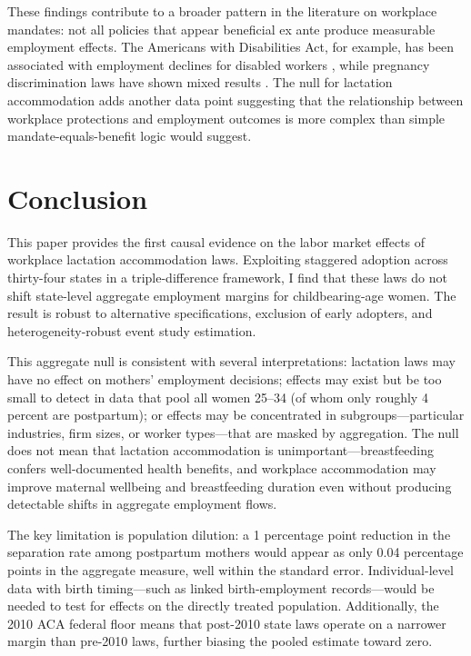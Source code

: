 \documentclass[12pt]{article}
\begin{document}
These findings contribute to a broader pattern in the literature on workplace mandates: not all policies that appear beneficial ex ante produce measurable employment effects. The Americans with Disabilities Act, for example, has been associated with employment declines for disabled workers \citep{acemoglu2001}, while pregnancy discrimination laws have shown mixed results \citep{gruber1994}. The null for lactation accommodation adds another data point suggesting that the relationship between workplace protections and employment outcomes is more complex than simple mandate-equals-benefit logic would suggest.


\section{Conclusion}
\label{sec:conclusion}

This paper provides the first causal evidence on the labor market effects of workplace lactation accommodation laws. Exploiting staggered adoption across thirty-four states in a triple-difference framework, I find that these laws do not shift state-level aggregate employment margins for childbearing-age women. The result is robust to alternative specifications, exclusion of early adopters, and heterogeneity-robust event study estimation.

This aggregate null is consistent with several interpretations: lactation laws may have no effect on mothers' employment decisions; effects may exist but be too small to detect in data that pool all women 25--34 (of whom only roughly 4 percent are postpartum); or effects may be concentrated in subgroups---particular industries, firm sizes, or worker types---that are masked by aggregation. The null does not mean that lactation accommodation is unimportant---breastfeeding confers well-documented health benefits, and workplace accommodation may improve maternal wellbeing and breastfeeding duration even without producing detectable shifts in aggregate employment flows.

The key limitation is population dilution: a 1 percentage point reduction in the separation rate among postpartum mothers would appear as only 0.04 percentage points in the aggregate measure, well within the standard error. Individual-level data with birth timing---such as linked birth-employment records---would be needed to test for effects on the directly treated population. Additionally, the 2010 ACA federal floor means that post-2010 state laws operate on a narrower margin than pre-2010 laws, further biasing the pooled estimate toward zero.
\end{document}
